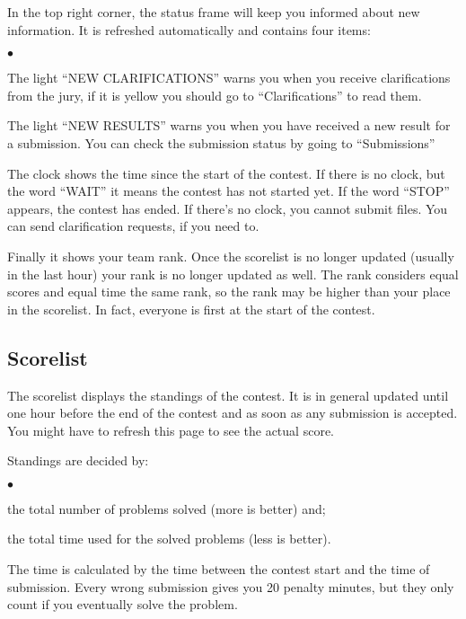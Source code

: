 \documentclass[a4paper,12pt]{article}
\newenvironment{citemize}
  {\begin{list}{$\bullet$}{\topsep 0cm \itemsep 0cm}}
  {\end{list}}
\begin{document}
In the top right corner, the status frame will keep you informed about new
information. It is refreshed automatically and contains four items:

\begin{citemize}
\item The light ``NEW CLARIFICATIONS'' warns you when you receive
clarifications from the jury, if it is yellow you should go to
``Clarifications'' to read them.

\item The light ``NEW RESULTS'' warns you when you have received a new result
for a submission. You can check the submission status by going to
``Submissions''

\item The clock shows the time since the start of the contest. If there is
no clock, but the word ``WAIT'' it means the contest has not started yet. If
the word ``STOP'' appears, the contest has ended. If there's no clock, you
cannot submit files. You can send clarification requests, if you need to.

\item Finally it shows your team rank. Once the scorelist is no longer
updated (usually in the last hour) your rank is no longer updated as well.
The rank considers equal scores and equal time the same rank, so the rank
may be higher than your place in the scorelist. In fact, everyone is first
at the start of the contest.

\end{citemize}

\subsection{Scorelist}

The scorelist displays the standings of the contest. It is in general
updated until one hour before the end of the contest and as soon as any
submission is accepted. You might have to refresh this page to see the
actual score.

Standings are decided by:

\begin{citemize}
\item the total number of problems solved (more is better) and;
\item the total time used for the solved problems (less is better).
\end{citemize}

The time is calculated by the time between the contest start and the time of
submission. Every wrong submission gives you 20 penalty minutes, but they
only count if you eventually solve the problem.
\end{document}
